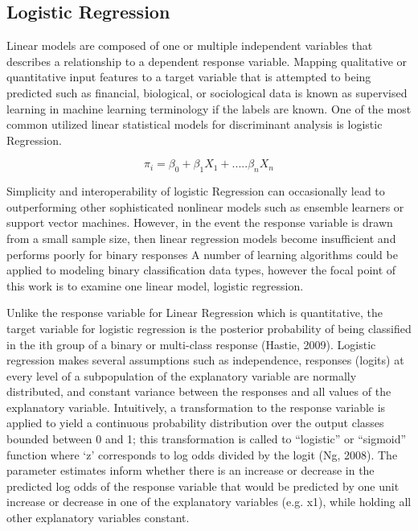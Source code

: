 \documentclass{llncs}
\begin{document}
\subsection{Logistic Regression}

Linear models are composed of one or multiple independent variables that describes a relationship to a dependent response variable. Mapping qualitative or quantitative input features to a target variable that is attempted to being predicted such as financial, biological, or sociological data is known as supervised learning in machine learning terminology if the labels are known.  One of the most common utilized linear statistical models for discriminant analysis is logistic Regression.

\begin{equation}
\pi_{i} = \beta_{0} + \beta_{1}X_{1} + .....\beta_{n}X_{n}
\end{equation}

Simplicity and interoperability of logistic Regression can occasionally lead to outperforming other sophisticated nonlinear models such as ensemble learners or support vector machines. However, in the event the response variable is drawn from a small sample size, then linear regression models become insufficient and performs poorly for binary responses A number of learning algorithms could be applied to modeling binary classification data types, however the focal point of this work is to examine one linear model, logistic regression. 
 
Unlike the response variable for Linear Regression which is quantitative, the target variable for logistic regression is the posterior probability of being classified in the ith group of a binary or multi-class response (Hastie, 2009). Logistic regression makes several assumptions such as independence, responses (logits) at every level of a subpopulation of the explanatory variable are normally distributed, and constant variance between the responses and all values of the explanatory variable. Intuitively, a transformation to the response variable is applied to yield a continuous probability distribution over the output classes bounded between 0 and 1; this transformation is called to “logistic” or “sigmoid” function where ‘z’ corresponds to log odds divided by the logit (Ng, 2008). The parameter estimates inform whether there is an increase or decrease in the predicted log odds of the response variable that would be predicted by one unit increase or decrease in one of the explanatory variables (e.g. x1), while holding all other explanatory variables constant.
\end{document}
